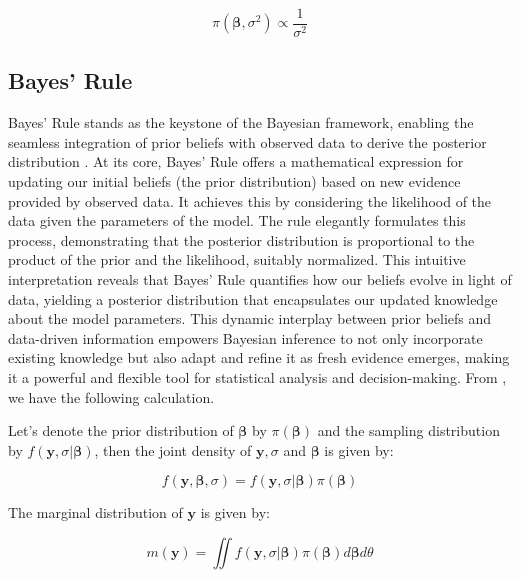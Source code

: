 \begin{equation}
\pi \left( \bm{\beta}, \sigma^2 \right) \propto \frac{1}{\sigma^{2}}
\label{eq:prior}
\end{equation}

\subsection{Bayes' Rule}

Bayes' Rule stands as the keystone of the Bayesian framework, enabling the seamless integration of prior beliefs with observed data to derive the posterior distribution \cite{stone2013bayes}. At its core, Bayes' Rule offers a mathematical expression for updating our initial beliefs (the prior distribution) based on new evidence provided by observed data. It achieves this by considering the likelihood of the data given the parameters of the model. The rule elegantly formulates this process, demonstrating that the posterior distribution is proportional to the product of the prior and the likelihood, suitably normalized. This intuitive interpretation reveals that Bayes' Rule quantifies how our beliefs evolve in light of data, yielding a posterior distribution that encapsulates our updated knowledge about the model parameters. This dynamic interplay between prior beliefs and data-driven information empowers Bayesian inference to not only incorporate existing knowledge but also adapt and refine it as fresh evidence emerges, making it a powerful and flexible tool for statistical analysis and decision-making. From \cite{gelman2013bayesian}, we have the following calculation.

Let's denote the prior distribution of $\bm{\beta}$ by $\pi \left( \bm{\beta} \right)$ and the sampling distribution by $f\left( \bm{y}, \sigma| \bm{\beta} \right)$, then the joint density of $\bm{y}, \sigma$ and $\bm{\beta}$ is given by:

\begin{equation}
f\left(\bm{y},\bm{\beta},\sigma\right) = f\left( \bm{y}, \sigma| \bm{\beta} \right) \pi \left( \bm{\beta} \right)
\label{eq:jointDensity}
\end{equation}

The marginal distribution of $\bm{y}$ is given by:

\begin{equation}
m \left( \bm{y} \right) = \iint f\left( \bm{y}, \sigma | \bm{\beta} \right) \pi \left( \bm{\beta} \right) d \bm{\beta} d \theta
\label{eq:marginalDistribution}
\end{equation}


